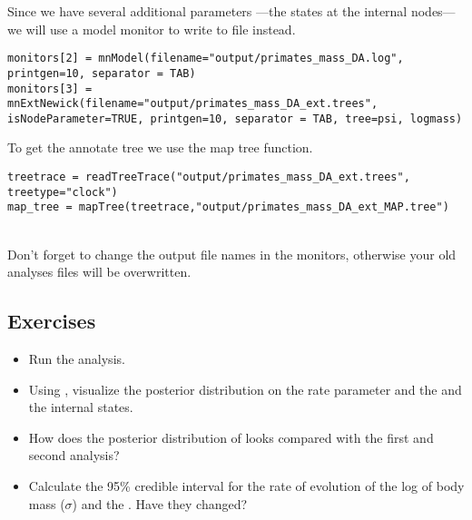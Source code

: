 Since we have several additional parameters ---the states at the internal nodes--- we will use a model monitor to write to file instead.
{\tt \small \begin{snugshade*}
\begin{lstlisting}
monitors[2] = mnModel(filename="output/primates_mass_DA.log", printgen=10, separator = TAB)
monitors[3] = mnExtNewick(filename="output/primates_mass_DA_ext.trees", isNodeParameter=TRUE, printgen=10, separator = TAB, tree=psi, logmass)
\end{lstlisting}
\end{snugshade*}}

To get the annotate tree we use the map tree function.

{\tt \small \begin{snugshade*}
\begin{lstlisting}
treetrace = readTreeTrace("output/primates_mass_DA_ext.trees", treetype="clock")
map_tree = mapTree(treetrace,"output/primates_mass_DA_ext_MAP.tree")
\end{lstlisting}
\end{snugshade*}}


\noindent \\ \impmark Don't forget to change the output file names in the monitors, otherwise your old analyses files will be overwritten.


\subsection*{Exercises}

\begin{itemize}
\item
Run the analysis.
\item
Using , visualize the posterior distribution on the rate parameter  and the  and the internal states.
\item 
How does the posterior distribution of  looks compared with the first and second analysis?
\item
Calculate the 95\% credible interval for the rate of evolution of the log of body mass ($\sigma$) and the . Have they changed?
\end{itemize}

\vspace{5cm}



